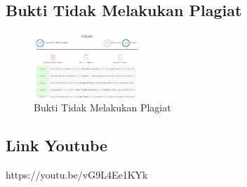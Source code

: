 \subsection{Bukti Tidak Melakukan Plagiat}
\hfill\break
\begin{figure}[H]
	\includegraphics[width=4cm]{figures/1174087/5/plagiat.png}
	\centering
	\caption{Bukti Tidak Melakukan Plagiat}
\end{figure}

\subsection{Link Youtube}
https://youtu.be/vG9L4Ee1KYk